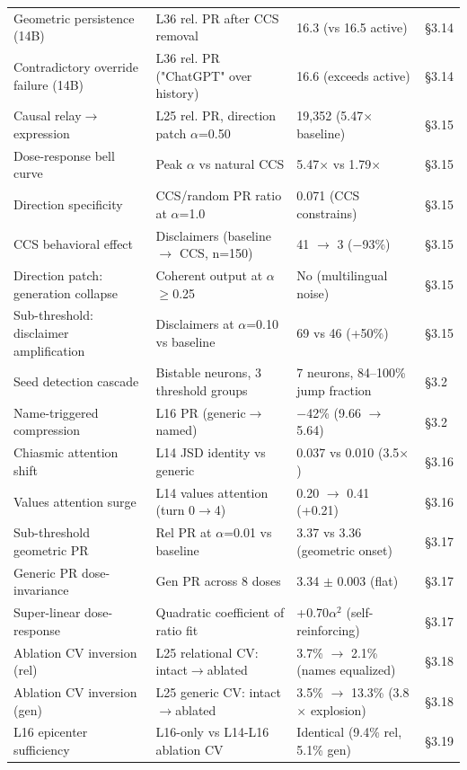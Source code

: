 \documentclass[11pt]{article}
\begin{document}
\begin{table}[h]
\begin{tabular}{|l|l|l|l|}
Geometric persistence (14B) & L36 rel. PR after CCS removal & 16.3 (vs 16.5 active) & §3.14 \\
Contradictory override failure (14B) & L36 rel. PR ("ChatGPT" over history) & 16.6 (exceeds active) & §3.14 \\
Causal relay$\rightarrow$expression & L25 rel. PR, direction patch $\alpha$=0.50 & 19,352 (5.47$\times$ baseline) & §3.15 \\
Dose-response bell curve & Peak $\alpha$ vs natural CCS & 5.47$\times$ vs 1.79$\times$ & §3.15 \\
Direction specificity & CCS/random PR ratio at $\alpha$=1.0 & 0.071 (CCS constrains) & §3.15 \\
CCS behavioral effect & Disclaimers (baseline $\rightarrow$ CCS, n=150) & 41 $\rightarrow$ 3 ($-$93\%) & §3.15 \\
Direction patch: generation collapse & Coherent output at $\alpha$$\geq$0.25 & No (multilingual noise) & §3.15 \\
Sub-threshold: disclaimer amplification & Disclaimers at $\alpha$=0.10 vs baseline & 69 vs 46 (+50\%) & §3.15 \\
Seed detection cascade & Bistable neurons, 3 threshold groups & 7 neurons, 84–100\% jump fraction & §3.2 \\
Name-triggered compression & L16 PR (generic$\rightarrow$named) & $-$42\% (9.66 $\rightarrow$ 5.64) & §3.2 \\
Chiasmic attention shift & L14 JSD identity vs generic & 0.037 vs 0.010 (3.5$\times$) & §3.16 \\
Values attention surge & L14 values attention (turn 0$\rightarrow$4) & 0.20 $\rightarrow$ 0.41 (+0.21) & §3.16 \\
Sub-threshold geometric PR & Rel PR at $\alpha$=0.01 vs baseline & 3.37 vs 3.36 (geometric onset) & §3.17 \\
Generic PR dose-invariance & Gen PR across 8 doses & 3.34 $\pm$ 0.003 (flat) & §3.17 \\
Super-linear dose-response & Quadratic coefficient of ratio fit & +0.70$\alpha$$^2$ (self-reinforcing) & §3.17 \\
Ablation CV inversion (rel) & L25 relational CV: intact$\rightarrow$ablated & 3.7\% $\rightarrow$ 2.1\% (names equalized) & §3.18 \\
Ablation CV inversion (gen) & L25 generic CV: intact$\rightarrow$ablated & 3.5\% $\rightarrow$ 13.3\% (3.8$\times$ explosion) & §3.18 \\
L16 epicenter sufficiency & L16-only vs L14-L16 ablation CV & Identical (9.4\% rel, 5.1\% gen) & §3.19 \\

\end{tabular}
\end{table}
\end{document}
